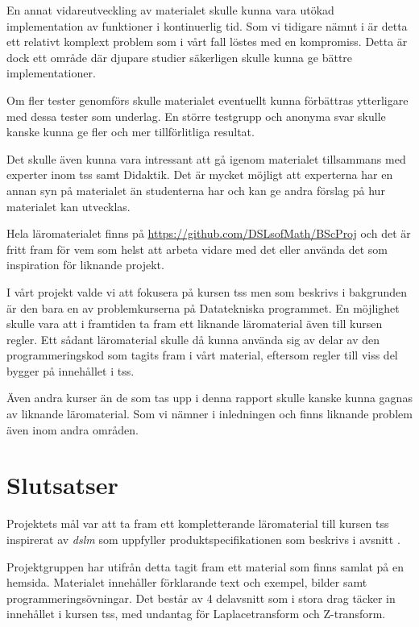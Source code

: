 \documentclass[12pt,a4paper,twoside,openright]{article}
\begin{document}
En annat vidareutveckling av materialet skulle kunna vara utökad
implementation av funktioner i kontinuerlig tid. Som vi tidigare nämnt
i  är detta ett relativt komplext problem som i
vårt fall löstes med en kompromiss. Detta är dock ett område där
djupare studier säkerligen skulle kunna ge bättre implementationer.

Om fler tester genomförs skulle materialet eventuellt kunna förbättras
ytterligare med dessa tester som underlag. En större testgrupp och
anonyma svar skulle kanske kunna ge fler och mer tillförlitliga
resultat.

Det skulle även kunna vara intressant att gå igenom materialet
tillsammans med experter inom \gls{tss} samt Didaktik. Det är
mycket möjligt att experterna har en annan syn på materialet än
studenterna har och kan ge andra förslag på hur materialet kan
utvecklas.

Hela läromaterialet finns på
\url{https://github.com/DSLsofMath/BScProj} och det är fritt fram för
vem som helst att arbeta vidare med det eller använda det som
inspiration för liknande projekt.

I vårt projekt valde vi att fokusera på kursen \gls{tss} men som
beskrivs i bakgrunden är den bara en av problemkurserna på
Datatekniska programmet. En möjlighet skulle vara att i framtiden ta
fram ett liknande läromaterial även till kursen
\gls{regler}. Ett sådant läromaterial skulle då kunna använda
sig av delar av den programmeringskod som tagits fram i vårt material,
eftersom \gls{regler} till viss del bygger på innehållet i
\gls{tss}.

Även andra kurser än de som tas upp i denna rapport skulle kanske
kunna gagnas av liknande läromaterial. Som vi nämner i inledningen och
 finns liknande problem även inom andra
områden.

\newpage

\section{Slutsatser}

Projektets mål var att ta fram ett kompletterande läromaterial till
kursen \gls{tss} inspirerat av \textit{\gls{dslm}} som uppfyller
produktspecifikationen som beskrivs i avsnitt .

Projektgruppen har utifrån detta tagit fram ett material som finns
samlat på en hemsida. Materialet innehåller förklarande text och
exempel, bilder samt programmeringsövningar. Det består av 4
delavsnitt som i stora drag täcker in innehållet i kursen
\gls{tss}, med undantag för Laplacetransform och Z-transform.
\end{document}
